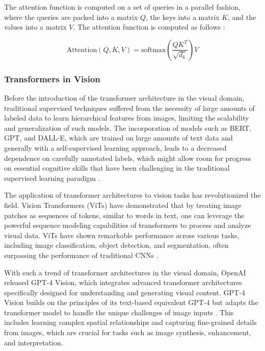 \documentclass[english, 12pt, a4paper, elec, utf8, a-2b, online]{aaltothesis}
\begin{document}
The attention function is computed on a set of queries in a parallel fashion, where the queries are packed into a matrix $Q$, the keys into a matrix $K$, and the values into a matrix $V$.
The attention function is computed as follows \cite{Vaswani2017}:

\begin{equation}
    \text{Attention}(Q, K, V) = \text{softmax}\left(\frac{QK^T}{\sqrt{d_k}}\right)V
\end{equation}

\subsubsection{Transformers in Vision}

Before the introduction of the transformer architecture in the visual domain, traditional supervised techniques suffered from the necessity of large amounts of labeled data to learn hierarchical features from images, limiting the scalability and generalization of such models.
The incorporation of models such as BERT, GPT, and DALL-E, which are trained on large amounts of text data and generally with a self-supervised learning approach, leads to a decreased dependence on carefully annotated labels, which might allow room for progress on essential cognitive skills that have been challenging in the traditional supervised learning paradigm \cite{Bommasani2021, Zellers2019, Martin2023}.

The application of transformer architectures to vision tasks has revolutionized the field.
Vision Transformers (ViTs) have demonstrated that by treating image patches as sequences of tokens, similar to words in text, one can leverage the powerful sequence modeling capabilities of transformers to process and analyze visual data.
ViTs have shown remarkable performance across various tasks, including image classification, object detection, and segmentation, often surpassing the performance of traditional \ac{CNN}s \cite{Dosovitskiy2021}.

With such a trend of transformer architectures in the visual domain, OpenAI released GPT-4 Vision, which integrates advanced transformer architectures specifically designed for understanding and generating visual content.
GPT-4 Vision builds on the principles of its text-based equivalent GPT-4 but adapts the transformer model to handle the unique challenges of image inputs \cite{2023GPT4VisionSC}.
This includes learning complex spatial relationships and capturing fine-grained details from images, which are crucial for tasks such as image synthesis, enhancement, and interpretation.
\end{document}
